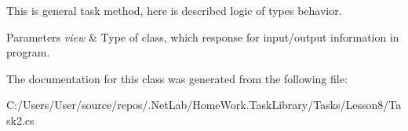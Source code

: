 This is general task method, here is described logic of types behavior. 


\begin{DoxyParams}{Parameters}
{\em view} & Type of class, which response for input/output information in program.\\
\hline
\end{DoxyParams}


The documentation for this class was generated from the following file\+:\begin{DoxyCompactItemize}
\item 
C\+:/\+Users/\+User/source/repos/.\+Net\+Lab/\+Home\+Work.\+Task\+Library/\+Tasks/\+Lesson8/Task2.\+cs\end{DoxyCompactItemize}
